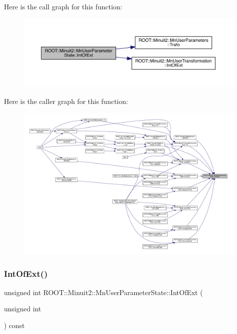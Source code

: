 Here is the call graph for this function\+:
\nopagebreak
\begin{figure}[H]
\begin{center}
\leavevmode
\includegraphics[width=350pt]{d3/de0/classROOT_1_1Minuit2_1_1MnUserParameterState_ab07f3ff917c70471b327243764aaad83_cgraph}
\end{center}
\end{figure}
Here is the caller graph for this function\+:
\nopagebreak
\begin{figure}[H]
\begin{center}
\leavevmode
\includegraphics[width=350pt]{d3/de0/classROOT_1_1Minuit2_1_1MnUserParameterState_ab07f3ff917c70471b327243764aaad83_icgraph}
\end{center}
\end{figure}
\mbox{\label{classROOT_1_1Minuit2_1_1MnUserParameterState_ab07f3ff917c70471b327243764aaad83}} 
\subsubsection{\texorpdfstring{IntOfExt()}{IntOfExt()}\hspace{0.1cm}{\footnotesize\ttfamily [3/3]}}
{\footnotesize\ttfamily unsigned int R\+O\+O\+T\+::\+Minuit2\+::\+Mn\+User\+Parameter\+State\+::\+Int\+Of\+Ext (\begin{DoxyParamCaption}\item[{unsigned int}]{ }\end{DoxyParamCaption}) const}

